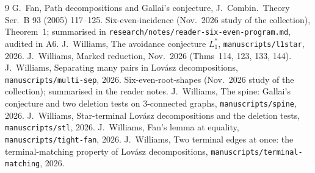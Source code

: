 \documentclass[11pt]{amsart}
\theoremstyle{definition}
\begin{document}
\begin{thebibliography}{9}
 G.~Fan, Path decompositions and Gallai's conjecture, J.~Combin.\ Theory Ser.~B 93
(2005) 117--125.
 Six-even-incidence (Nov.~2026 study of the collection), Theorem~1; summarised in
\texttt{research/notes/reader-six-even-program.md}, audited in A6.
 J.~Williams, The avoidance conjecture $L_1^*$, \texttt{manuscripts/l1star}, 2026.
 J.~Williams, Marked reduction, Nov.~2026 (Thms~114, 123, 133, 144).
 J.~Williams, Separating many pairs in Lov\'asz decompositions,
\texttt{manuscripts/multi-sep}, 2026.
 Six-even-root-shapes (Nov.~2026 study of the collection); summarised in the reader
notes.
 J.~Williams, The spine: Gallai's conjecture and two deletion tests on $3$-connected
graphs, \texttt{manuscripts/spine}, 2026.
 J.~Williams, Star-terminal Lov\'asz decompositions and the deletion tests,
\texttt{manuscripts/stl}, 2026.
 J.~Williams, Fan's lemma at equality, \texttt{manuscripts/tight-fan}, 2026.
 J.~Williams, Two terminal edges at once: the terminal-matching property of Lov\'asz
decompositions, \texttt{manuscripts/terminal-matching}, 2026.
\end{thebibliography}
\end{document}
